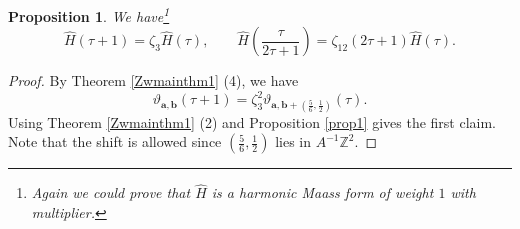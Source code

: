 \documentclass[12pt,reqno]{amsart}
\renewcommand{\t}{\tau}
\newcommand{\z}{\zeta}
\renewcommand{\(}{\left\(}
\renewcommand{\)}{\right\)}
\numberwithin{equation}{section}
\theoremstyle{plain}
\newtheorem{proposition}[theorem]{Proposition}
\theoremstyle{definition}
\numberwithin{equation}{section}
\begin{document}
\begin{proposition}\label{hathtrans}
We have\footnote{Again we could prove that $\widehat{H}$ is a harmonic Maass form of weight $1$ with multiplier.}
\[
\widehat{H}\left(\t+1\right)=\z_3\widehat{H}(\t),\qquad \widehat{H}\left(\frac{\t}{2\t+1}\right)=\z_{12}(2\t+1)\widehat{H}(\t).
\]
\end{proposition}
\begin{proof}
By Theorem \ref{Zwmainthm1} (4), we have 
\[
\vartheta_{\bm{a},\bm{b}}(\t+1)=\z^{2}_3\vartheta_{\bm{a},\bm{b}+\left(\frac{5}{6},\frac 12\right)}(\t).
\]
Using Theorem \ref{Zwmainthm1} (2) and Proposition \ref{prop1} gives the first claim. Note that the shift is allowed since $(\frac 56,\frac 12)$ lies in $A^{-1}\mathbb{Z}^2$.



\end{proof}
\end{document}

